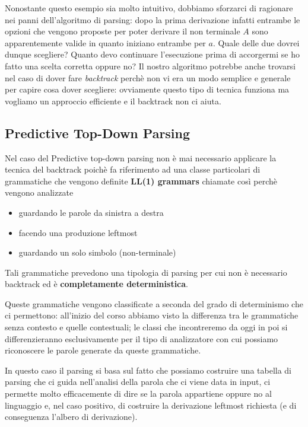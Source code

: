 \documentclass[class=book, crop=false, oneside, 12pt]{standalone}
\begin{document}
Nonostante questo esempio sia molto intuitivo, dobbiamo sforzarci di ragionare nei panni dell'algoritmo di parsing: dopo la prima derivazione infatti entrambe le opzioni che vengono proposte per poter derivare il non terminale \(A\) sono apparentemente valide in quanto iniziano entrambe per \(a\). Quale delle due dovrei dunque scegliere? Quanto devo continuare l'esecuzione prima di accorgermi se ho fatto una scelta corretta oppure no? Il nostro algoritmo potrebbe anche trovarsi nel caso di dover fare \emph{backtrack} perchè non vi era un modo semplice e generale per capire cosa dover scegliere: ovviamente questo tipo di tecnica funziona ma vogliamo un approccio efficiente e il backtrack non ci aiuta.

\subsection{Predictive Top-Down Parsing}

Nel caso del Predictive top-down parsing non è mai necessario applicare la tecnica del backtrack poichè fa riferimento ad una classe particolari di grammatiche che vengono definite \textbf{LL(1) grammars} chiamate così perchè vengono analizzate
\begin{itemize}
    \item guardando le parole da sinistra a destra
    \item facendo una produzione leftmost
    \item guardando un solo simbolo (non-terminale)
\end{itemize}

Tali grammatiche prevedono una tipologia di parsing per cui non è necessario backtrack ed è \textbf{completamente deterministica}.

Queste grammatiche vengono classificate a seconda del grado di determinismo che ci permettono: all'inizio del corso abbiamo visto la differenza tra le grammatiche senza contesto e quelle contestuali; le classi che incontreremo da oggi in poi si differenzieranno esclusivamente per il tipo di analizzatore con cui possiamo riconoscere le parole generate da queste grammatiche. 

In questo caso il parsing si basa sul fatto che possiamo costruire una tabella di parsing che ci guida nell'analisi della parola che ci viene data in input, ci permette molto efficacemente di dire se la parola appartiene oppure no al linguaggio e, nel caso positivo, di costruire la derivazione leftmost richiesta (e di conseguenza l'albero di derivazione). 
\end{document}
